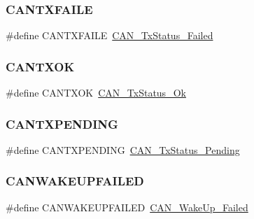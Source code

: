 \mbox{\label{group___c_a_n___legacy_gae315f7ee14af20ca8454be9e507873cd}} 
\subsubsection{\texorpdfstring{CANTXFAILE}{CANTXFAILE}}
{\footnotesize\ttfamily \#define C\+A\+N\+T\+X\+F\+A\+I\+LE~\mbox{\hyperlink{group___c_a_n__transmit__constants_ga8d193002e76c04ec8caff6b110cd5983}{C\+A\+N\+\_\+\+Tx\+Status\+\_\+\+Failed}}}

\mbox{\label{group___c_a_n___legacy_ga288ba42cf1de7572f2fe1378268c9452}} 
\subsubsection{\texorpdfstring{CANTXOK}{CANTXOK}}
{\footnotesize\ttfamily \#define C\+A\+N\+T\+X\+OK~\mbox{\hyperlink{group___c_a_n__transmit__constants_ga0b401c61922b1449de9b486dcf475c97}{C\+A\+N\+\_\+\+Tx\+Status\+\_\+\+Ok}}}

\mbox{\label{group___c_a_n___legacy_ga76f43f4c54505b1f87b39b056ca38897}} 
\subsubsection{\texorpdfstring{CANTXPENDING}{CANTXPENDING}}
{\footnotesize\ttfamily \#define C\+A\+N\+T\+X\+P\+E\+N\+D\+I\+NG~\mbox{\hyperlink{group___c_a_n__transmit__constants_ga9678a3a51379422868083608c7394409}{C\+A\+N\+\_\+\+Tx\+Status\+\_\+\+Pending}}}

\mbox{\label{group___c_a_n___legacy_ga0de3b0e2c544d9fa772b646e331e51b1}} 
\subsubsection{\texorpdfstring{CANWAKEUPFAILED}{CANWAKEUPFAILED}}
{\footnotesize\ttfamily \#define C\+A\+N\+W\+A\+K\+E\+U\+P\+F\+A\+I\+L\+ED~\mbox{\hyperlink{group___c_a_n__wake__up__constants_ga837fd7ad47fee78e43a186544e2b390b}{C\+A\+N\+\_\+\+Wake\+Up\+\_\+\+Failed}}}

